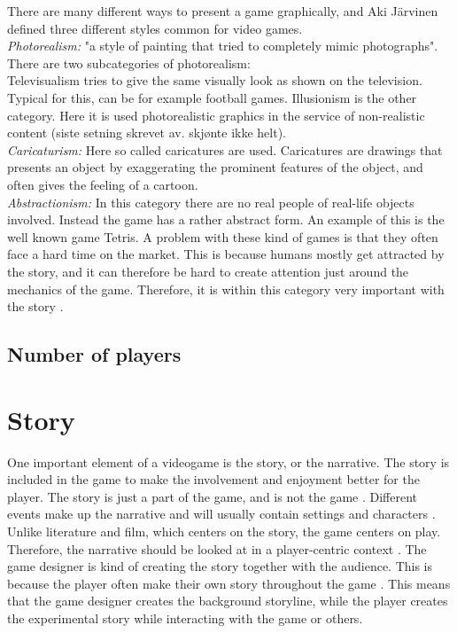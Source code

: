 There are many different ways to present a game graphically, and Aki Järvinen defined three different styles common for video games. \\ 
\emph{Photorealism:} "a style of painting that tried to completely mimic photographs". There are two subcategories of photorealism: \\
Televisualism tries to give the same visually look as shown on the television. Typical for this, can be for example football games. Illusionism is the other category. Here it is used photorealistic graphics in the service of non-realistic content (siste setning skrevet av. skjønte ikke helt). \\
\emph{Caricaturism:} Here so called caricatures are used. Caricatures are drawings that presents an object by exaggerating the prominent features of the object, and often gives the feeling of a cartoon. \\
\emph{Abstractionism:} In this category there are no real people of real-life objects involved. Instead  the game has a rather abstract form. An example of this is the well known game Tetris. A problem with these kind of games is that they often face a hard time on the market. This is because humans mostly get attracted by the story, and it can therefore be hard to create attention just around the mechanics of the game. Therefore, it is within this category very important with the story \cite{understandingvg}. 

\subsection{Number of players}

\section{Story}
One important element of a videogame is the story, or the narrative. The story is included in the game to make the involvement and enjoyment better for the player. The story is just a part of the game, and is not the game \cite{umlapproach}.  Different events make up the narrative and will usually contain settings and characters \cite{understandingvg}. Unlike literature and film, which centers on the story, the game centers on play. Therefore, the narrative should be looked at in a player-centric context \cite{gametheory}. The game designer is kind of creating the story together with the audience. This is because the player often make their own story throughout the game \cite{umlapproach}. This means that the game designer creates the background storyline, while the player creates the experimental story while interacting with the game or others. 

